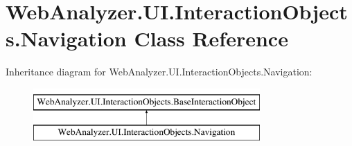\hypertarget{class_web_analyzer_1_1_u_i_1_1_interaction_objects_1_1_navigation}{}\section{Web\+Analyzer.\+U\+I.\+Interaction\+Objects.\+Navigation Class Reference}
\label{class_web_analyzer_1_1_u_i_1_1_interaction_objects_1_1_navigation}
Inheritance diagram for Web\+Analyzer.\+U\+I.\+Interaction\+Objects.\+Navigation\+:\begin{figure}[H]
\begin{center}
\leavevmode
\includegraphics[height=2.000000cm]{class_web_analyzer_1_1_u_i_1_1_interaction_objects_1_1_navigation}
\end{center}
\end{figure}
